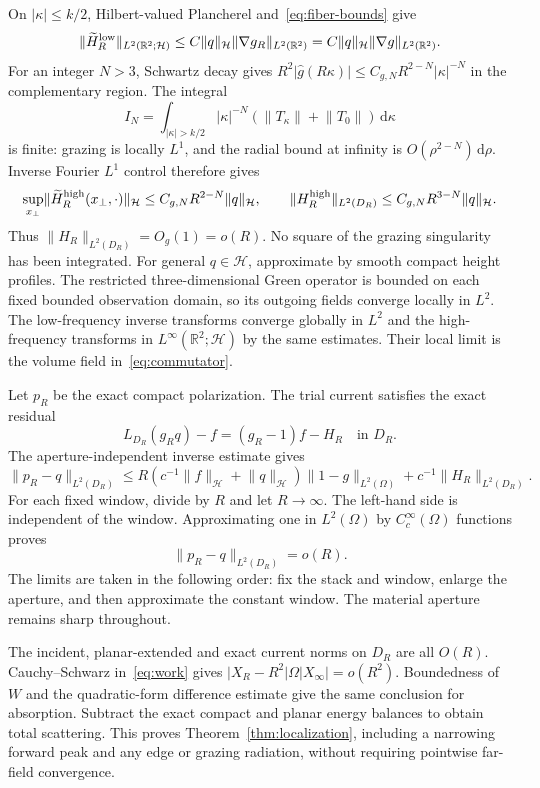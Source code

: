 \documentclass[11pt,a4paper]{article}
\theoremstyle{remark}
\newcommand{\norm}[1]{\lVert #1\rVert}
\newcommand{\abs}[1]{\lvert #1\rvert}
\newcommand{\dd}{\,\mathrm d}
\begin{document}
On $\abs\kappa\leq k/2$, Hilbert-valued Plancherel and~\eqref{eq:fiber-bounds} give
\[
 \norm{\widetilde H_R^{\rm low}}_{L^2(\mathbb R^2;\mathcal H)}
 \leq C\norm q_{\mathcal H}\norm{\nabla g_R}_{L^2(\mathbb R^2)}
 =C\norm q_{\mathcal H}\norm{\nabla g}_{L^2(\mathbb R^2)}.
\]
For an integer $N>3$, Schwartz decay gives $R^2\abs{\widehat g(R\kappa)}\leq C_{g,N}R^{2-N}\abs\kappa^{-N}$ in the complementary region. The integral
\[
 I_N=\int_{\abs\kappa>k/2}\abs\kappa^{-N}(\norm{T_\kappa}+\norm{T_0})\dd\kappa
\]
is finite: grazing is locally $L^1$, and the radial bound at infinity is $O(\rho^{2-N})\dd\rho$. Inverse Fourier $L^1$ control therefore gives
\[
 \sup_{x_\perp}\norm{\widetilde H_R^{\rm high}(x_\perp,\cdot)}_{\mathcal H}
 \leq C_{g,N}R^{2-N}\norm q_{\mathcal H},\qquad
 \norm{H_R^{\rm high}}_{L^2(D_R)}\leq C_{g,N}R^{3-N}\norm q_{\mathcal H}.
\]
Thus $\norm{H_R}_{L^2(D_R)}=O_g(1)=o(R)$. No square of the grazing singularity has been integrated. For general $q\in\mathcal H$, approximate by smooth compact height profiles. The restricted three-dimensional Green operator is bounded on each fixed bounded observation domain, so its outgoing fields converge locally in $L^2$. The low-frequency inverse transforms converge globally in $L^2$ and the high-frequency transforms in $L^\infty(\mathbb R^2;\mathcal H)$ by the same estimates. Their local limit is the volume field in~\eqref{eq:commutator}.

Let $p_R$ be the exact compact polarization. The trial current satisfies the exact residual
\[
 L_{D_R}(g_Rq)-f=(g_R-1)f-H_R\quad\text{in }D_R.
\]
The aperture-independent inverse estimate gives
\begin{equation}\label{eq:current-estimate}
 \norm{p_R-q}_{L^2(D_R)}
 \leq R(c^{-1}\norm f_{\mathcal H}+\norm q_{\mathcal H})\norm{1-g}_{L^2(\Omega)}
 +c^{-1}\norm{H_R}_{L^2(D_R)}.
\end{equation}
For each fixed window, divide by $R$ and let $R\to\infty$. The left-hand side is independent of the window. Approximating one in $L^2(\Omega)$ by $C_c^\infty(\Omega)$ functions proves
\begin{equation}\label{eq:current-limit}
 \norm{p_R-q}_{L^2(D_R)}=o(R).
\end{equation}
The limits are taken in the following order: fix the stack and window, enlarge the aperture, and then approximate the constant window. The material aperture remains sharp throughout.

The incident, planar-extended and exact current norms on $D_R$ are all $O(R)$. Cauchy--Schwarz in~\eqref{eq:work} gives $\abs{X_R-R^2\abs\Omega X_\infty}=o(R^2)$. Boundedness of $W$ and the quadratic-form difference estimate give the same conclusion for absorption. Subtract the exact compact and planar energy balances to obtain total scattering. This proves Theorem~\ref{thm:localization}, including a narrowing forward peak and any edge or grazing radiation, without requiring pointwise far-field convergence.
\end{document}
